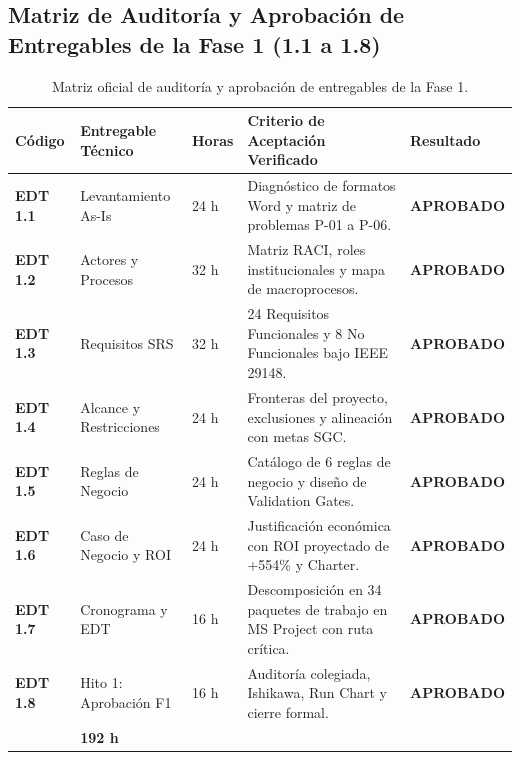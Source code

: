 \documentclass[12pt,a4paper]{article}
\begin{document}
\subsection{Matriz de Auditoría y Aprobación de Entregables de la Fase 1 (1.1 a 1.8)}
\begin{table}[H]
\centering
\small
\renewcommand{\arraystretch}{1.2}
\begin{tabularx}{\textwidth}{|>{\hsize=0.55\hsize\centering\arraybackslash\bfseries\footnotesize}X|>{\hsize=1.15\hsize\raggedright\arraybackslash\footnotesize}X|>{\hsize=0.50\hsize\centering\arraybackslash\footnotesize}X|>{\hsize=2.10\hsize\raggedright\arraybackslash\footnotesize}X|>{\hsize=0.70\hsize\centering\arraybackslash\footnotesize}X|}
\hline
\rowcolor{tableheader}
\textbf{Código} & \textbf{Entregable Técnico} & \textbf{Horas} & \textbf{Criterio de Aceptación Verificado} & \textbf{Resultado} \\
\hline
\textbf{EDT 1.1} & Levantamiento As-Is & 24 h & Diagnóstico de formatos Word y matriz de problemas P-01 a P-06. & \textbf{APROBADO} \\
\hline
\textbf{EDT 1.2} & Actores y Procesos & 32 h & Matriz RACI, roles institucionales y mapa de macroprocesos. & \textbf{APROBADO} \\
\hline
\textbf{EDT 1.3} & Requisitos SRS & 32 h & 24 Requisitos Funcionales y 8 No Funcionales bajo IEEE 29148. & \textbf{APROBADO} \\
\hline
\textbf{EDT 1.4} & Alcance y Restricciones & 24 h & Fronteras del proyecto, exclusiones y alineación con metas SGC. & \textbf{APROBADO} \\
\hline
\textbf{EDT 1.5} & Reglas de Negocio & 24 h & Catálogo de 6 reglas de negocio y diseño de Validation Gates. & \textbf{APROBADO} \\
\hline
\textbf{EDT 1.6} & Caso de Negocio y ROI & 24 h & Justificación económica con ROI proyectado de +554\% y Charter. & \textbf{APROBADO} \\
\hline
\textbf{EDT 1.7} & Cronograma y EDT & 16 h & Descomposición en 34 paquetes de trabajo en MS Project con ruta crítica. & \textbf{APROBADO} \\
\hline
\textbf{EDT 1.8} & Hito 1: Aprobación F1 & 16 h & Auditoría colegiada, Ishikawa, Run Chart y cierre formal. & \textbf{APROBADO} \\
\hline
\multicolumn{2}{|r|}{\textbf{TOTAL HORAS FASE 1:}} & \textbf{192 h} & \multicolumn{2}{l|}{\textbf{100\% de Tareas de Fase 1 Completadas (Semana 1)}} \\
\hline
\end{tabularx}
\caption{Matriz oficial de auditoría y aprobación de entregables de la Fase 1.}
\label{tab:auditoria_fase1}
\end{table}
\end{document}
